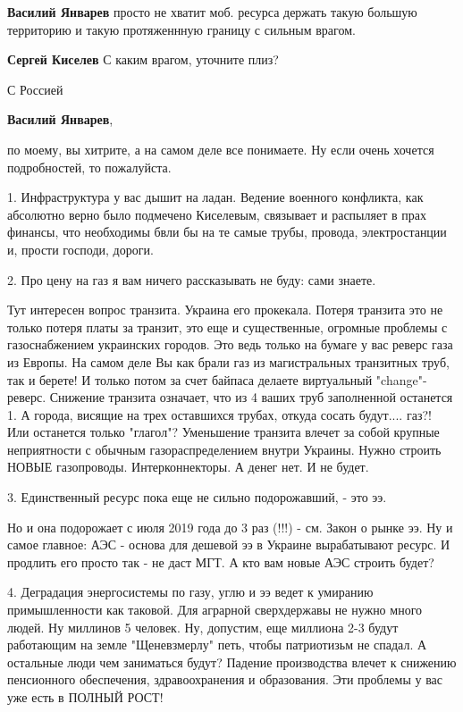 \begin{itemize}
\begin{itemize}
\textbf{Василий Январев} просто не хватит моб. ресурса держать такую большую территорию и такую протяженнную границу с сильным врагом.

\textbf{Сергей Киселев} С каким врагом, уточните плиз?

С Россией

\textbf{Василий Январев}, 

по моему, вы хитрите, а на самом деле все понимаете.
Ну если очень хочется подробностей, то пожалуйста.

1. Инфраструктура у вас дышит на ладан. Ведение военного конфликта, как
абсолютно верно было подмечено Киселевым, связывает и распыляет в прах финансы,
что необходимы бвли бы на те самые трубы, провода, электростанции и, прости
господи, дороги.

2. Про цену на газ я вам ничего рассказывать не буду: сами знаете.

Тут интересен вопрос транзита.  Украина его прокекала.  Потеря транзита это не
только потеря платы за транзит, это еще и существенные, огромные проблемы с
газоснабжением украинских городов.  Это ведь только на бумаге у вас реверс газа
из Европы.  На самом деле Вы как брали газ из магистральных транзитных труб,
так и берете! И только потом за счет байпаса делаете виртуальный "change"-
реверс.  Снижение транзита означает, что из 4 ваших труб заполненной останется
1.  А города, висящие на трех оставшихся трубах, откуда сосать будут.... газ?!
Или останется только "глагол"?  Уменьшение транзита влечет за собой крупные
неприятности с обычным газораспределением внутри Украины.  Нужно строить НОВЫЕ
газопроводы. Интерконнекторы.  А денег нет.  И не будет.

3. Единственный ресурс пока еще не сильно подорожавший, - это ээ.

Но и она подорожает с июля 2019 года до 3 раз (!!!) - см. Закон о рынке ээ.  Ну
и самое главное: АЭС - основа для дешевой ээ в Украине вырабатывают ресурс.  И
продлить его просто так - не даст МГТ.  А кто вам новые АЭС строить будет?

4. Деградация энергосистемы по газу, углю и ээ ведет к умиранию примышленности
как таковой.  Для аграрной сверхдержавы не нужно много людей.  Ну миллинов 5
человек. Ну, допустим, еще миллиона 2-3 будут работающим на земле "Щеневзмерлу"
петь, чтобы патриотизьм не спадал.  А остальные люди чем заниматься будут?
Падение производства влечет к снижению пенсионного обеспечения, здравоохранения
и образования.  Эти проблемы у вас уже есть в ПОЛНЫЙ РОСТ!


\end{itemize}
\end{itemize}
